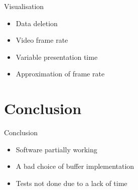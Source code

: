 \documentclass[t,14pt]{beamer}
\begin{document}
	\begin{frame}{Visualisation}
	\vspace*{5mm}
	\begin{itemize}[<+->]
		\item Data deletion
		\item Video frame rate
		\item Variable presentation time
		\item Approximation of frame rate
	\end{itemize}
	\end{frame}
	
\section[Conclusion]{Conclusion}
	\begin{frame}{Conclusion}
		\vspace*{5mm}
		\begin{itemize}
		\item Software partially working
		\item A bad choice of buffer implementation
		\item Tests not done due to a lack of time
		\end{itemize}
	\end{frame}
\end{document}
